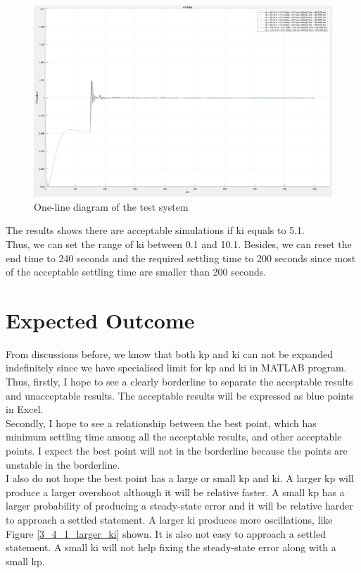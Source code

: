 \documentclass{report}
\begin{document}
\begin{figure}[htbp]
\centering
\includegraphics[width = \textwidth]{figure/4_1_1_c.jpeg}
\caption{One-line diagram of the test system}
\label{4_1_1_c}
\end{figure}

The results shows there are acceptable simulations if ki equals to 5.1. \\

Thus, we can set the range of ki between 0.1 and 10.1. 
Besides, we can reset the end time to 240 seconds and the required settling time to 200 seconds since most of the acceptable settling time are smaller than 200 seconds.\\

\section{Expected Outcome} %
From discussions before, we know that both kp and ki can not be expanded indefinitely since we have specialised limit for kp and ki in MATLAB program. Thus, firstly, I hope to see a clearly borderline to separate the acceptable results and unacceptable results. The acceptable results will be expressed as blue points in Excel. \\

Secondly, I hope to see a relationship between the best point, which has minimum settling time among all the acceptable results, and other acceptable points. I expect the best point will not in the borderline because the points are unstable in the borderline. \\

I also do not hope the best point has a large or small kp and ki. A larger kp will produce a larger overshoot although it will be relative faster. A small kp has a larger probability of producing a steady-state error and it will be relative harder to approach a settled statement. A larger ki produces more oscillations, like Figure \textcolor{red}{\ref{3_4_1_larger_ki}} shown. It is also not easy to approach a settled statement. A small ki will not help fixing the steady-state error along with a small kp. \\
\end{document}
